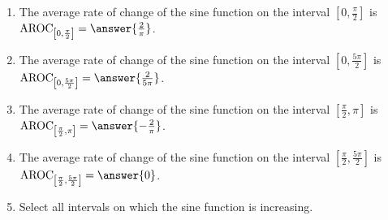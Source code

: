 \documentclass{ximera}
\author{Kenneth Berglund}
\begin{document}
\licenseAPC
\begin{exercise}
\begin{enumerate}
\item The average rate of change of the sine function on the interval $\left[0, \frac{\pi}{2}\right]$ is $\av_{\left[0, \frac{\pi}{2}\right]} = \answer{\frac{2}{\pi}}$.

\item The average rate of change of the sine function on the interval $\left[0, \frac{5\pi}{2}\right]$ is $\av_{\left[0, \frac{5\pi}{2}\right]} = \answer{\frac{2}{5\pi}}$.

\item The average rate of change of the sine function on the interval $\left[\frac{\pi}{2}, 
\pi\right]$ is $\av_{\left[\frac{\pi}{2}, \pi\right]} = \answer{-\frac{2}{\pi}}$.

\item The average rate of change of the sine function on the interval $\left[\frac{\pi}{2}, 
\frac{5\pi}{2}\right]$ is $\av_{\left[\frac{\pi}{2}, \frac{5\pi}{2}\right]} = \answer{0}$.

\item Select all intervals on which the sine function is increasing.
\begin{selectAll}
\end{selectAll}
\end{enumerate}

\end{exercise}
\end{document}
